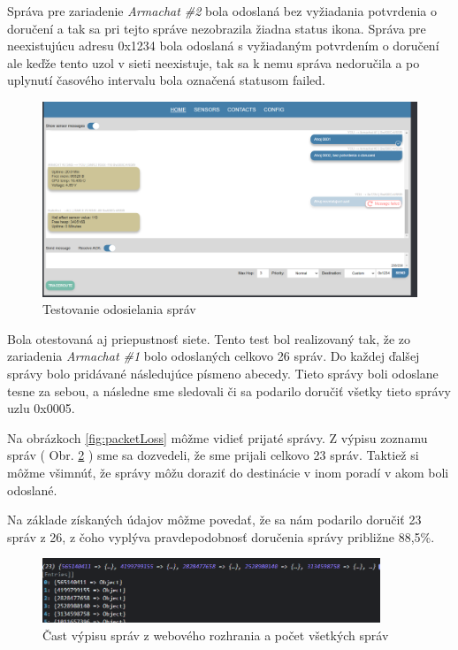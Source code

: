\documentclass[slovak,master]{diploma}
\begin{document}
Správa pre zariadenie \emph{Armachat \#2} bola odoslaná bez vyžiadania potvrdenia o doručení a tak sa pri tejto 
správe nezobrazila žiadna status ikona. Správa pre neexistujúcu adresu 0x1234 bola odoslaná s vyžiadaným potvrdením o doručení ale keďže tento uzol v sieti neexistuje, tak sa 
k nemu správa nedoručila a po uplynutí časového intervalu bola označená statusom failed.

\begin{figure}[h!]
  \centering
  \includegraphics[width=1\textwidth]{Figures/testingFull.png}
  \caption{Testovanie odosielania správ}
  \label{fig:testingFull}
\end{figure}

Bola otestovaná aj priepustnosť siete. Tento test bol realizovaný tak, že zo zariadenia \emph{Armachat \#1} bolo odoslaných celkovo 26 správ. Do každej ďalšej správy 
bolo pridávané následujúce písmeno abecedy. Tieto správy boli odoslane tesne za sebou, a následne sme sledovali či sa podarilo doručiť všetky tieto správy uzlu 0x0005.

Na obrázkoch \ref{fig:packetLoss} môžme vidieť prijaté správy. Z výpisu zoznamu správ ( Obr. \ref{fig:packetLossSum} ) sme sa dozvedeli, že sme prijali celkovo 23 správ. Taktiež si môžme všimnúť, že správy 
môžu doraziť do destinácie v inom poradí v akom boli odoslané.

Na základe získaných údajov môžme povedať, že sa nám podarilo doručiť 23 správ z 26, z čoho vyplýva pravdepodobnosť doručenia správy približne 88,5\%.
\begin{figure}[h!]
  \centering
  \includegraphics[width=0.9\textwidth]{Figures/packetLoss.png}
  \caption{Čast výpisu správ z webového rozhrania a počet všetkých správ}
  \label{fig:packetLossSum}
\end{figure}
\end{document}
